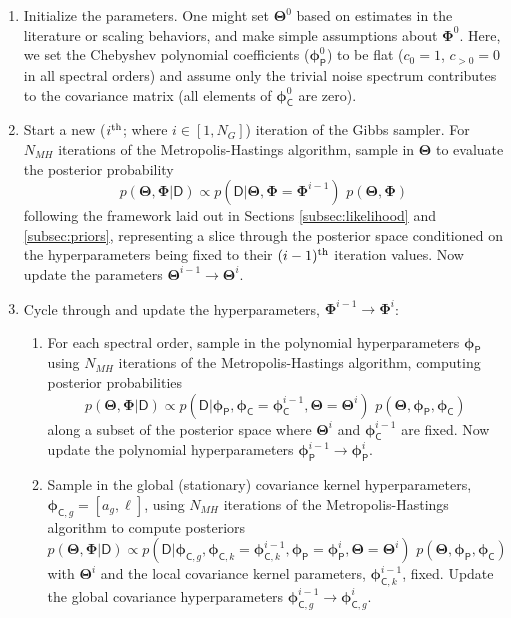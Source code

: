 \documentclass[iop,floatfix]{emulateapj}
\newcommand{\vD}{\mathsf{D}}
\newcommand{\vT}{ {\bm \Theta}}
\newcommand{\vp}{ {\bm \phi}}
\newcommand{\vP}{ {\bm \Phi}}
\newcommand{\cheb}{ \vp_{\mathsf{P}}}
\newcommand{\cov}{ \vp_{\mathsf{C}}}
\begin{document}
\begin{enumerate}
\item Initialize the parameters.  One might set $\vT^0$ based on estimates in the literature or 
scaling behaviors, and make simple assumptions about $\vP^0$.  Here, we set the Chebyshev 
polynomial coefficients ($\cheb^0$) to be flat ($c_0 = 1$,  $c_{>0} = 0$ in all spectral orders) 
and assume only the trivial noise spectrum contributes to the covariance matrix (all elements of 
$\cov^0$ are zero).  

\item Start a new ($i^{\rm th}$; where $i \in [1,N_G]$) iteration of the Gibbs sampler.  For 
$N_{MH}$ iterations of the Metropolis-Hastings algorithm, sample in $\vT$ to evaluate the posterior 
probability 
\begin{equation}
p(\vT,\vP|\vD) \propto p(\vD | \vT, \vP = \vP^{i-1}) \,\, p(\vT,\vP)
\end{equation}
following the framework laid out in Sections \ref{subsec:likelihood} and \ref{subsec:priors}, 
representing a slice through the posterior space conditioned on the hyperparameters being fixed to 
their $(i-1)^{\rm th}$ iteration values.  Now update the parameters $\vT^{i-1} \rightarrow \vT^i$.

\item Cycle through and update the hyperparameters, $\vP^{i-1} \rightarrow \vP^i$:  

\begin{enumerate}
\item For each spectral order, sample in the polynomial hyperparameters $\cheb$ using $N_{MH}$ 
iterations of the Metropolis-Hastings algorithm, computing posterior probabilities
\begin{equation}
p(\vT,\vP|\vD) \propto p(\vD | \cheb, \cov = \cov^{i-1}, \vT = \vT^i) \,\, p(\vT, \cheb, \cov)
\end{equation}
along a subset of the posterior space where $\vT^i$ and $\cov^{i-1}$ are fixed.  Now update the 
polynomial hyperparameters $\cheb^{i-1} \rightarrow \cheb^i$.  

\item Sample in the global (stationary) covariance kernel hyperparameters, $\vp_{{\mathsf C},g} = 
[a_g, \ell]$, using $N_{MH}$ iterations of the Metropolis-Hastings algorithm to compute posteriors
\begin{equation}
p(\vT,\vP|\vD) \propto p(\vD | \vp_{{\mathsf C}, g}, \vp_{{\mathsf C}, k} = \vp_{{\mathsf C, k}}^{i-1}, \cheb = \cheb^i, \vT = \vT^i) \,\, p(\vT, \cheb, \cov)
\end{equation}
with $\vT^i$ and the local covariance kernel parameters, $\vp_{{\mathsf C}, k}^{i-1}$, fixed.  
Update the global covariance hyperparameters $\vp_{{\mathsf C}, g}^{i-1} \rightarrow \vp_{{\mathsf 
C}, g}^i$.


\end{enumerate}
\end{enumerate}
\end{document}
